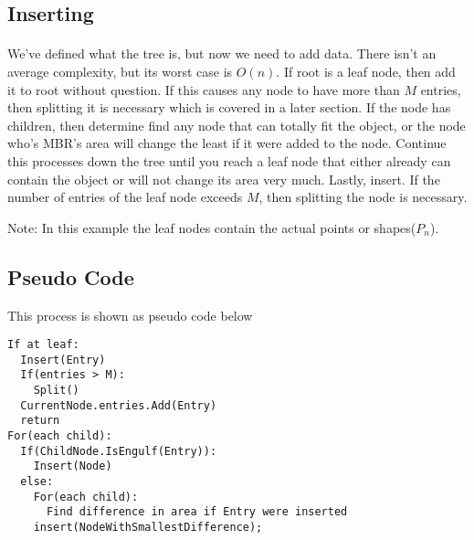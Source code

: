 \documentclass{article}
\begin{document}
\begin{multicols}{2}[]
\section{Inserting}
\paragraph{}
We've defined what the tree is, but now we need to add data. There isn't an average complexity, but its worst
case is $O(n)$. If root is a leaf node, then add it to root without question. If this causes any node to have
 more than $M$ entries, then splitting it is necessary
which is covered in a later section. If the node has children, then determine find any node that can totally
fit the object, or the node who's MBR's area will change the least if it were added to the node. Continue this
processes down the tree until you reach a leaf node that either already can contain the object or will not change
its area very much. Lastly, insert. If the number of entries of the leaf node exceeds $M$, then splitting the
node is necessary.

\begin{minipage}{\linewidth}
\centering
{}

Note: In this example the leaf nodes contain the actual points or shapes($P_n$).
\end{minipage}

\subsection*{Pseudo Code}
This process is shown as pseudo code below


\begin{lstlisting}    
If at leaf:
  Insert(Entry)
  If(entries > M):
    Split()
  CurrentNode.entries.Add(Entry)
  return
For(each child):
  If(ChildNode.IsEngulf(Entry)):
    Insert(Node)
  else:
    For(each child):
      Find difference in area if Entry were inserted
    insert(NodeWithSmallestDifference);
\end{lstlisting}



\end{multicols}
\end{document}
